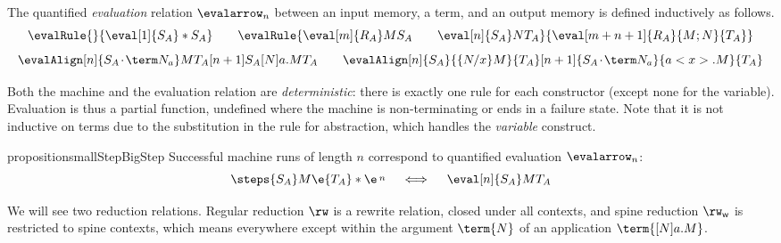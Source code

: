 \documentclass[a4paper,UKenglish,cleveref, autoref, thm-restate]{lipics-v2021}
\newcommand\spine{\mathsf w}
\newcommand\msep{\kern1pt{\cdot}\kern1pt}
\begin{document}
\begin{definition}
The quantified \emph{evaluation} relation $\evalarrow_n$ between an input memory, a term, and an output memory is defined inductively as follows.
\[
\evalRule {} {\eval[1]{S_A}*{S_A}}
\qquad
\evalRule {\eval[m]{R_A}M{S_A} \qquad \eval[n]{S_A}N{T_A}} {\eval[m+n+1]{R_A}{M;N}{T_A}}
\]
\[
\evalAlign 
  [n]   {S_A\msep\term N_a}       M  {T_A}
  [n+1] {S_A}               {[N]a.M} {T_A}
\qquad  
\evalAlign 
  [n]   {S_A}             {\{N/x\}M} {T_A}
  [n+1] {S_A\msep\term N_a} {a<x>.M} {T_A}
\]
\end{definition}

Both the machine and the evaluation relation are \emph{deterministic}: there is exactly one rule for each constructor (except none for the variable). Evaluation is thus a partial function, undefined where the machine is non-terminating or ends in a failure state. Note that it is not inductive on terms due to the substitution in the rule for abstraction, which handles the \emph{variable} construct.

\begin{restatable}{proposition}{smallStepBigStep}
\label{prop:semantics agree}
Successful machine runs of length $n$ correspond to quantified evaluation $\evalarrow_n$:
\[
\steps 
  {S_A} M \e 
  {T_A} * \e
\,\raisebox{2pt}{$\scriptstyle n$}
\quad\iff\quad 
	\eval[n]{S_A}M{T_A}
\]
\end{restatable}

We will see two reduction relations. Regular reduction $\rw$ is a rewrite relation, closed under all contexts, and spine reduction $\rw_\spine$ is restricted to spine contexts, which means everywhere except within the argument $\term{N}$ of an application $\term{[N]a.M}$. 
\end{document}
